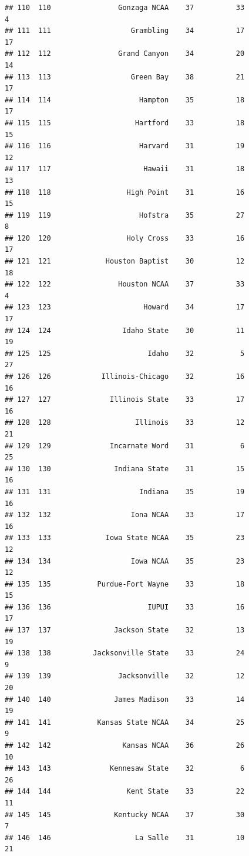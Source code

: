 \documentclass[]{book}
\begin{document}
\begin{verbatim}
## 110  110                Gonzaga NCAA    37          33             4
## 111  111                   Grambling    34          17            17
## 112  112                Grand Canyon    34          20            14
## 113  113                   Green Bay    38          21            17
## 114  114                     Hampton    35          18            17
## 115  115                    Hartford    33          18            15
## 116  116                     Harvard    31          19            12
## 117  117                      Hawaii    31          18            13
## 118  118                  High Point    31          16            15
## 119  119                     Hofstra    35          27             8
## 120  120                  Holy Cross    33          16            17
## 121  121             Houston Baptist    30          12            18
## 122  122                Houston NCAA    37          33             4
## 123  123                      Howard    34          17            17
## 124  124                 Idaho State    30          11            19
## 125  125                       Idaho    32           5            27
## 126  126            Illinois-Chicago    32          16            16
## 127  127              Illinois State    33          17            16
## 128  128                    Illinois    33          12            21
## 129  129              Incarnate Word    31           6            25
## 130  130               Indiana State    31          15            16
## 131  131                     Indiana    35          19            16
## 132  132                   Iona NCAA    33          17            16
## 133  133             Iowa State NCAA    35          23            12
## 134  134                   Iowa NCAA    35          23            12
## 135  135           Purdue-Fort Wayne    33          18            15
## 136  136                       IUPUI    33          16            17
## 137  137               Jackson State    32          13            19
## 138  138          Jacksonville State    33          24             9
## 139  139                Jacksonville    32          12            20
## 140  140               James Madison    33          14            19
## 141  141           Kansas State NCAA    34          25             9
## 142  142                 Kansas NCAA    36          26            10
## 143  143              Kennesaw State    32           6            26
## 144  144                  Kent State    33          22            11
## 145  145               Kentucky NCAA    37          30             7
## 146  146                    La Salle    31          10            21

\end{verbatim}
\end{document}
